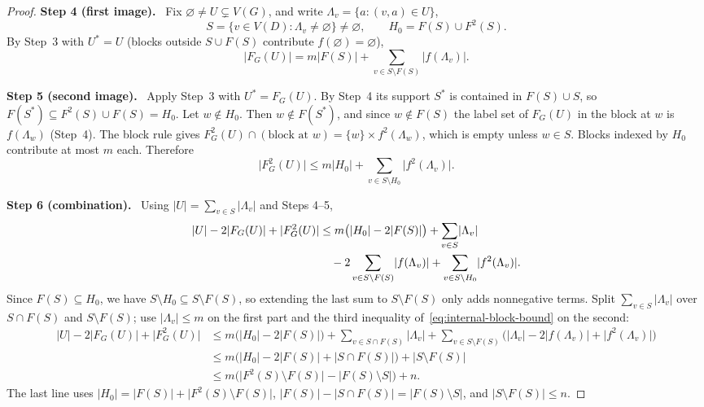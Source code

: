 \documentclass[11pt]{article}
\theoremstyle{remark}
\newcommand{\abs}[1]{\lvert #1\rvert}
\newcommand{\step}[1]{\par\medskip\noindent\textbf{Step #1.}\ }
\begin{document}
\begin{proof}
\step{4 (first image)}
Fix $\varnothing\ne U\subsetneq V(G)$, and write
$\Lambda_v=\{a:(v,a)\in U\}$,
\[
  S=\{v\in V(D):\Lambda_v\ne\varnothing\}\neq\varnothing,\qquad
  H_0=F(S)\cup F^2(S).
\]
By Step~3 with $U^\ast=U$ (blocks outside $S\cup F(S)$ contribute
$f(\varnothing)=\varnothing$),
\[
  \abs{F_G(U)}=m\abs{F(S)}
     +\sum_{v\in S\setminus F(S)}\abs{f(\Lambda_v)}.
\]

\step{5 (second image)}
Apply Step~3 with $U^\ast=F_G(U)$. By Step~4 its support $S^\ast$ is contained
in $F(S)\cup S$, so $F(S^\ast)\subseteq F^2(S)\cup F(S)=H_0$. Let
$w\notin H_0$. Then $w\notin F(S^\ast)$, and since $w\notin F(S)$ the label set
of $F_G(U)$ in the block at $w$ is $f(\Lambda_w)$ (Step~4). The block rule
gives $F_G^2(U)\cap(\text{block at }w)=\{w\}\times f^2(\Lambda_w)$, which is
empty unless $w\in S$. Blocks indexed by $H_0$ contribute at most $m$ each.
Therefore
\[
  \abs{F_G^2(U)}\le m\abs{H_0}
     +\sum_{v\in S\setminus H_0}\abs{f^2(\Lambda_v)}.
\]

\step{6 (combination)}
Using $\abs U=\sum_{v\in S}\abs{\Lambda_v}$ and Steps 4--5,
\begin{align}
\label{eq:blowup-sharp}
  \abs{U}-2\abs{F_G(U)}+\abs{F_G^2(U)}
  &\le m\bigl(\abs{H_0}-2\abs{F(S)}\bigr)
       +\sum_{v\in S}\abs{\Lambda_v} \notag\\
  &\quad -2\sum_{v\in S\setminus F(S)}\abs{f(\Lambda_v)}
       +\sum_{v\in S\setminus H_0}\abs{f^2(\Lambda_v)}.
\end{align}
Since $F(S)\subseteq H_0$, we have $S\setminus H_0\subseteq S\setminus F(S)$,
so extending the last sum to $S\setminus F(S)$ only adds nonnegative terms.
Split $\sum_{v\in S}\abs{\Lambda_v}$ over $S\cap F(S)$ and $S\setminus F(S)$;
use $\abs{\Lambda_v}\le m$ on the first part and the third inequality
of~\eqref{eq:internal-block-bound} on the second:
\begin{align*}
  \abs{U}-2\abs{F_G(U)}+\abs{F_G^2(U)}
  &\le m\bigl(\abs{H_0}-2\abs{F(S)}\bigr)
     +\sum_{v\in S\cap F(S)}\abs{\Lambda_v}
     +\sum_{v\in S\setminus F(S)}
       \bigl(\abs{\Lambda_v}-2\abs{f(\Lambda_v)}+\abs{f^2(\Lambda_v)}\bigr)\\
  &\le m\bigl(\abs{H_0}-2\abs{F(S)}
                    +\abs{S\cap F(S)}\bigr)
       +\abs{S\setminus F(S)}\\
  &\le m\bigl(\abs{F^2(S)\setminus F(S)}
                    -\abs{F(S)\setminus S}\bigr)+n.
\end{align*}
The last line uses $\abs{H_0}=\abs{F(S)}+\abs{F^2(S)\setminus F(S)}$,
$\abs{F(S)}-\abs{S\cap F(S)}=\abs{F(S)\setminus S}$, and
$\abs{S\setminus F(S)}\le n$.


\end{proof}
\end{document}
